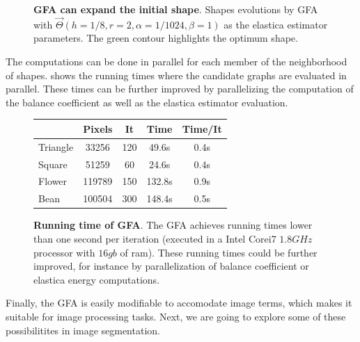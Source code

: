 \documentclass[review]{siamart220329}
\begin{document}
\begin{figure}
\caption{\textbf{GFA can expand the initial shape}. Shapes evolutions by GFA
with $\vec{\Theta}(h=1/8,r=2,\alpha=1/1024, \beta=1)$ as the elastica
estimator parameters. The green contour highlights the optimum shape.}
\label{fig:graph-flow-expand}
\end{figure}
%
%
The computations can be done in parallel for each member of the neighborhood of
shapes.  shows the running times where
the candidate graphs are evaluated in parallel. These times can be further
improved by parallelizing the computation of the balance coefficient as well as
the elastica estimator evaluation.
%
%
\begin{figure}[h!]
\center
\captionsetup{type=table}
\footnotesize
\caption{\textbf{Running time of GFA}. The GFA achieves running times lower than
one second per iteration (executed in a Intel Corei7 $1.8GHz$ processor with
$16gb$ of ram). These running times could be further improved, for instance
by parallelization of balance coefficient  or elastica energy
computations.}\label{tab:summary-graph-flow-running-time} 
\begin{tabular}{|l|c|c|c|c|}
\hline
& Pixels & It & Time & Time/It\\
\hline
Triangle & 33256 & 120 & 49.6s & 0.4s \\
Square & 51259 & 60 & 24.6s & 0.4s \\
Flower & 119789 & 150 & 132.8s & 0.9s \\
Bean & 100504 & 300 & 148.4s & 0.5s \\
\hline
\end{tabular}
\end{figure}
%
%
Finally, the GFA is easily modifiable to accomodate image terms, which makes it
suitable for image processing tasks. Next, we are going to explore some of these
possibilitites in image segmentation.
%
%
\end{document}
